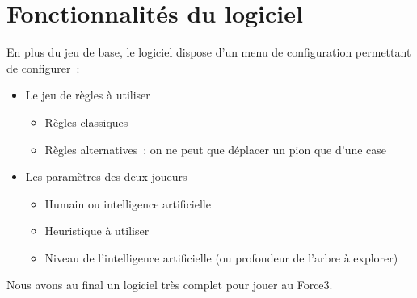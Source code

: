 \chapter{Fonctionnalités du logiciel}

En plus du jeu de base, le logiciel dispose d'un menu de configuration
permettant de configurer :
\begin{itemize}
    \item Le jeu de règles à utiliser
        \begin{itemize}
            \item Règles classiques
            \item Règles alternatives : on ne peut que déplacer un pion que d'une case
        \end{itemize}
    \item Les paramètres des deux joueurs
        \begin{itemize}
            \item Humain ou intelligence artificielle
            \item Heuristique à utiliser
            \item Niveau de l'intelligence artificielle (ou profondeur de
                l'arbre à explorer)
        \end{itemize}
\end{itemize}

Nous avons au final un logiciel très complet pour jouer au Force3.

